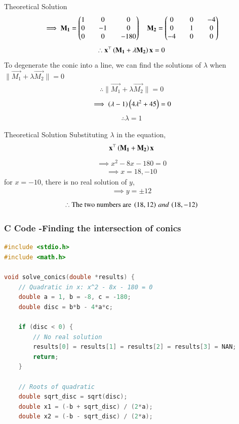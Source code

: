\documentclass{beamer}
\begin{document}
\begin{frame}{Theoretical Solution}
\begin{align}
    \implies \mathbf{M_1}=\begin{pmatrix}1&&0&&0\\0&&-1&&0\\0&&0&&-180\end{pmatrix} \quad 
    \mathbf{M_2}=\begin{pmatrix}0&&0&&-4\\0&&1&&0\\-4&&0&&0\end{pmatrix}
\end{align}
\begin{align}
    \therefore \mathbf{x}^{\top}\left(\mathbf{M_1+\lambda M_2}\right)\mathbf{x}=0
\end{align}
To degenerate the conic into a line, we can find the solutions of $\lambda$ when $\|\vec{M_1}+\lambda\vec{M_2}\|=0$
\begin{align}
    \therefore \|\vec{M_1}+\lambda\vec{M_2}\|=0
\end{align}
\begin{align}
    \implies \left(\lambda-1\right)\left(4\lambda^2+45\right)=0
\end{align}
\begin{align}
    \therefore \lambda=1
\end{align}
\end{frame}

\begin{frame}{Theoretical Solution}
Substituting $\lambda$ in the equation,
\begin{align}
    \mathbf{x}^{\top}\left(\mathbf{M_1}+\mathbf{M_2}\right)\mathbf{x}
\end{align}
\begin{align}
    \implies x^2-8x-180=0
\end{align}
\begin{align}
    \implies x=18,-10
\end{align}
for $x=-10$, there is no real solution of $y$,
\begin{align}
    \implies y=\pm 12
\end{align}
\begin{align}
    \therefore \text{The two numbers are }\left(18,12\right)\, and\, \left(18,-12\right)
\end{align}

\end{frame}

\begin{frame}[fragile]
    \frametitle{C Code -Finding the intersection of conics}

    \begin{lstlisting}[language=C]
#include <stdio.h>
#include <math.h>

void solve_conics(double *results) {
    // Quadratic in x: x^2 - 8x - 180 = 0
    double a = 1, b = -8, c = -180;
    double disc = b*b - 4*a*c;

    if (disc < 0) {
        // No real solution
        results[0] = results[1] = results[2] = results[3] = NAN;
        return;
    }

    // Roots of quadratic
    double sqrt_disc = sqrt(disc);
    double x1 = (-b + sqrt_disc) / (2*a);
    double x2 = (-b - sqrt_disc) / (2*a);


    \end{lstlisting}
\end{frame}
\end{document}
